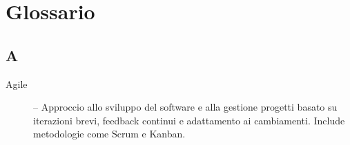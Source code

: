\cleardoublepage
\chapter*{Glossario}


\section*{A}
\begin{description}
    \item[Agile] -- Approccio allo sviluppo del software e alla gestione progetti basato su iterazioni brevi, feedback continui e adattamento ai cambiamenti. Include metodologie come Scrum e Kanban.
\end{description}

